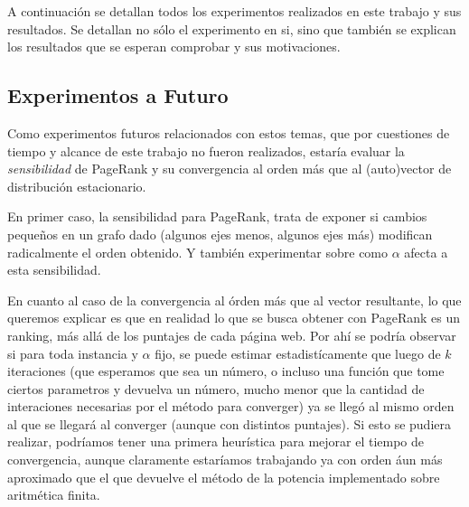 \par A continuaci\'on se detallan todos los experimentos realizados en este
trabajo y sus resultados. Se detallan no s\'olo el experimento en si, sino que
tambi\'en se explican los resultados que se esperan comprobar y sus
motivaciones.



\newpage


\newpage


\newpage


\newpage


\newpage


\newpage


\newpage


\newpage
\subsection{Experimentos a Futuro}
\par Como experimentos futuros relacionados con estos temas, que por cuestiones
de tiempo y alcance de este trabajo no fueron realizados, estar\'ia evaluar la
\emph{sensibilidad} de PageRank y su convergencia al orden m\'as que al
(auto)vector de distribuci\'on estacionario.

\par En primer caso, la sensibilidad para PageRank, trata de exponer si cambios
peque\~nos en un grafo dado (algunos ejes menos, algunos ejes m\'as) modifican
radicalmente el orden obtenido. Y tambi\'en experimentar sobre como $\alpha$
afecta a esta sensibilidad.

\par En cuanto al caso de la convergencia al \'orden m\'as que al vector
resultante, lo que queremos explicar es que en realidad lo que se busca obtener
con PageRank es un ranking, m\'as all\'a de los puntajes de cada p\'agina web.
Por ah\'i se podr\'ia observar si para toda instancia y $\alpha$ fijo, se puede
estimar estadist\'icamente que luego de $k$ iteraciones (que esperamos que sea
un n\'umero, o incluso una funci\'on que tome ciertos parametros y devuelva un
n\'umero, mucho menor que la cantidad de interaciones necesarias por el
m\'etodo para converger) ya se lleg\'o al mismo orden al que se llegar\'a al
converger (aunque con distintos puntajes). Si esto se pudiera realizar,
podr\'iamos tener una primera heur\'istica para mejorar el tiempo de
convergencia, aunque claramente estar\'iamos trabajando ya con orden \'aun m\'as
aproximado que el que devuelve el m\'etodo de la potencia implementado sobre
aritm\'etica finita.
